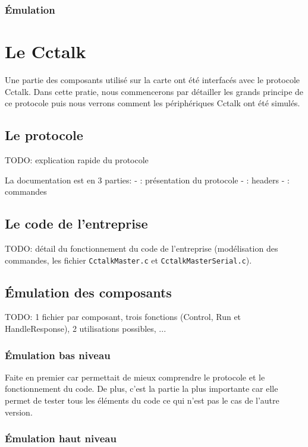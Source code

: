 \documentclass[a4paper]{article}
\begin{document}
\subsubsection*{Émulation}

\section{Le Cctalk}

Une partie des composants utilisé sur la carte ont été interfacés avec le
protocole Cctalk. Dans cette pratie, nous commencerons par détailler les grands
principe de ce protocole puis nous verrons comment les périphériques Cctalk ont
été simulés.

\subsection{Le protocole}

TODO: explication rapide du protocole

La documentation est en 3 parties:
- \cite{cctalkpt1}: présentation du protocole
- \cite{cctalkpt2}: headers
- \cite{cctalkpt3}: commandes

\subsection{Le code de l'entreprise}

TODO: détail du fonctionnement du code de l'entreprise (modélisation des
commandes, les fichier \lstinline{CctalkMaster.c} et
\lstinline{CctalkMasterSerial.c}).

\subsection{Émulation des composants}

TODO: 1 fichier par composant, trois fonctions (Control, Run et HandleResponse),
2 utilisations possibles, ...

\subsubsection{Émulation bas niveau}

Faite en premier car permettait de mieux comprendre le protocole et le
fonctionnement du code. De plus, c'est la partie la plus importante car elle
permet de tester tous les éléments du code ce qui n'est pas le cas de l'autre
version.

\subsubsection{Émulation haut niveau}
\end{document}
